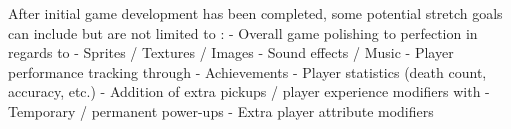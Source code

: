 After initial game development has been completed,
some potential stretch goals can include but are not limited to :
\newline\indent - Overall game polishing to perfection in regards to
\newline\indent \indent - Sprites / Textures / Images
\newline\indent \indent - Sound effects / Music
\newline\indent - Player performance tracking through
\newline\indent \indent - Achievements
\newline\indent \indent - Player statistics (death count, accuracy, etc.)
\newline\indent - Addition of extra pickups / player experience modifiers with
\newline\indent \indent - Temporary / permanent power-ups
\newline\indent \indent - Extra player attribute modifiers


